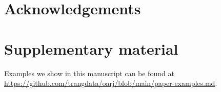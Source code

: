 \section{Acknowledgements}

\section{Supplementary material}

Examples we show in this manuscript can be found at \url{https://github.com/trangdata/oarj/blob/main/paper-examples.md}.



\address{Massimo Aria \\
 Università degli Studi di Napoli Federico II\\
 K-Synth srl, Academic Spin-off\\
 Department of Economics and Statistics\\
  Napoli, NA 80126\\
  Italy\\
  (0000-0002-8517-9411)\\
  }

\address{Trang Le\\
	Bristol Myers Squibb\\
    Cambridge, MA 02143\\
	USA\\
	(0000-0003-3737-6565)\\
	}

\address{Corrado Cuccurullo\\
  Università della Campania Luigi Vanvitelli\\
  Capua, CE 81043\\
  Italy\\
  Università degli Studi di Napoli Federico II\\
   K-Synth srl, Academic Spin-off\\
  Department of Economics and Statistics\\
  Napoli, NA 80126\\
  Italy\\
  (0000-0002-7401-8575)\\
  }
  
\address{Alessandra Belfiore\\
 Università degli Studi di Napoli Federico II\\
  K-Synth srl, Academic Spin-off\\
 Department of Economics and Statistics\\
Napoli, NA 80126\\
Italy\\
 (0000-0003-3709-9481)\\
  }
  
\address{June Choe\\
  University of Pennsylvania\\
  Philadelphia, PE 19104\\
  USA\\
 (0000-0002-0701-921X)\\
  }

